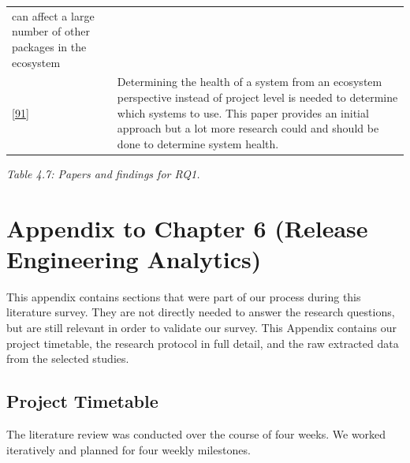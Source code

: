 \documentclass[]{book}
\begin{document}
\begin{longtable}[]{@{}ll@{}}
\begin{minipage}[t]{0.29\columnwidth}
can affect a large number of other packages in the ecosystem\strut
\end{minipage}\tabularnewline
\begin{minipage}[t]{0.13\columnwidth}\raggedright\strut
{[}\protect\hyperlink{ref-Jansen2014}{91}{]}\strut
\end{minipage} & \begin{minipage}[t]{0.29\columnwidth}\raggedright\strut
Determining the health of a system from an ecosystem perspective instead
of project level is needed to determine which systems to use. This paper
provides an initial approach but a lot more research could and should be
done to determine system health.\strut
\end{minipage}\tabularnewline
\bottomrule
\end{longtable}

\emph{Table 4.7: Papers and findings for RQ1.}

\section{Appendix to Chapter 6 (Release Engineering
Analytics)}\label{appendix-to-chapter-6-release-engineering-analytics}

This appendix contains sections that were part of our process during
this literature survey. They are not directly needed to answer the
research questions, but are still relevant in order to validate our
survey. This Appendix contains our project timetable, the research
protocol in full detail, and the raw extracted data from the selected
studies.

\subsection{Project Timetable}\label{project-timetable}

The literature review was conducted over the course of four weeks. We
worked iteratively and planned for four weekly milestones.
\end{document}
